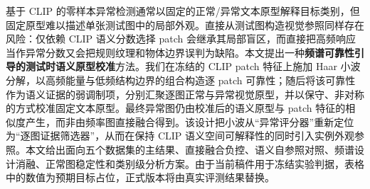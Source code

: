 基于 CLIP 的零样本异常检测通常以固定的正常/异常文本原型解释目标类别，但固定原型难以描述单张测试图中的局部外观。直接从测试图构造视觉参照同样存在风险：仅依赖 CLIP 语义分数选择 patch 会继承其局部盲区，而直接把高频响应当作异常分数又会把规则纹理和物体边界误判为缺陷。本文提出一种\textbf{频谱可靠性引导的测试时语义原型校准}方法。我们在冻结的 CLIP patch 特征上施加 Haar 小波分解，以高频能量与低频结构边界的组合构造逐 patch 可靠性；随后将该可靠性作为语义证据的弱调制项，分别汇聚逐图正常与异常视觉原型，并以保守、非对称的方式校准固定文本原型。最终异常图仍由校准后的语义原型与 patch 特征的相似度产生，而非由频率图直接融合得到。该设计把小波从“异常评分器”重新定位为“逐图证据筛选器”，从而在保持 CLIP 语义空间可解释性的同时引入实例外观参照。本文给出面向五个数据集的主结果、直接融合负控、语义自参照对照、频谱设计消融、正常图稳定性和类别级分析方案。由于当前稿件用于冻结实验判据，表格中的数值为预期目标占位，正式版本将由真实评测结果替换。
